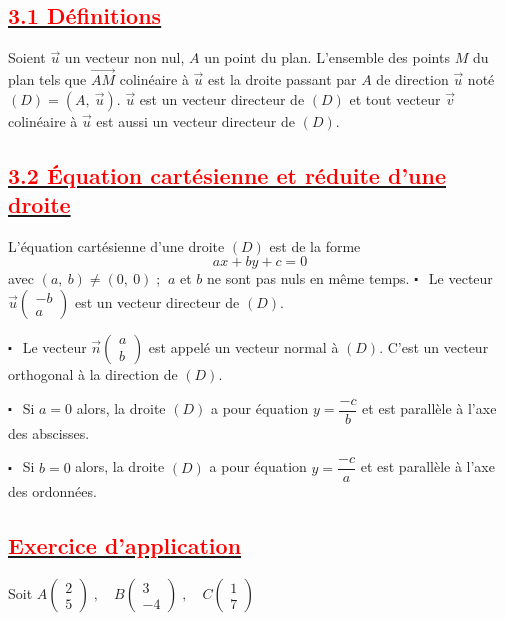 \documentclass[12pt]{article}
\begin{document}
\subsection*{\underline{\textcolor{red}{\textbf{3.1 Définitions}}}}	
Soient $\vec{u}$ un vecteur non nul, $A$ un point du plan. L'ensemble des points $M$ du plan tels que $\overrightarrow{AM}$ colinéaire à $\vec{u}$ est la droite passant par $A$ de direction $\vec{u}$ noté $(D)=(A,\ \vec{u}).$
$\vec{u}$ est un vecteur directeur de $(D)$ et tout vecteur $\vec{v}$ colinéaire à $\vec{u}$ est aussi un vecteur directeur de $(D).$
\subsection*{\underline{\textcolor{red}{\textbf{3.2 Équation cartésienne et réduite d'une droite}}}}
L'équation cartésienne d'une droite $(D)$ est de la forme $$ax+by+c=0$$ avec $(a,\ b)\neq(0,\ 0)\;$; $\ a$ et $b$ ne sont pas nuls en même temps.
	$\centerdot\ \ $ Le vecteur $\vec{u}\begin{pmatrix}
	-b\\
	a
	\end{pmatrix}$ est un vecteur directeur de $(D)$.
	
	$\centerdot\ \ $ Le vecteur $\vec{n}\begin{pmatrix}
	a\\
	b
	\end{pmatrix}$ est appelé un vecteur normal à $(D)$. C'est un vecteur orthogonal à la direction de $(D)$.
	
	$\centerdot\ \ $ Si $a=0$ alors, la droite $(D)$ a pour équation $y=\dfrac{-c}{b}$ et est parallèle à l'axe des abscisses.
	
	$\centerdot\ \ $ Si $b=0$ alors, la droite $(D)$ a pour équation $y=\dfrac{-c}{a}$ et est parallèle à l'axe des ordonnées.
\subsection*{\underline{\textcolor{red}{\textbf{Exercice d'application}}}}
Soit $A\begin{pmatrix} 2 \\ 5\end{pmatrix}\;,\quad B\begin{pmatrix} 3 \\ -4\end{pmatrix}\;,\quad C\begin{pmatrix} 1 \\ 7\end{pmatrix}$
\end{document}
